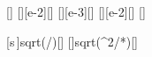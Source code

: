 [\Npm]
[\cm][e-2][\meter]
[\g][e-3][\kg]
[\cm][e-2][\meter]
[\mpss]

[s\,]{\sFX*sqrt(\kX/\mX)}[\mps]
[]{sqrt(\kX*\sFX^2/*\gX*\hTX)}[\mps]
